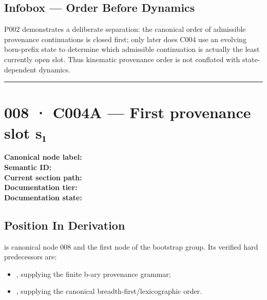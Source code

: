 \subsection{Infobox --- Order Before
Dynamics}\label{infobox-order-before-dynamics}

P002 demonstrates a deliberate separation: the canonical order of
admissible provenance continuations is closed first; only later does
C004 use an evolving born-prefix state to determine which admissible
continuation is actually the least currently open slot. Thus kinematic
provenance order is not conflated with state-dependent dynamics.

\begin{center}\rule{0.5\linewidth}{0.5pt}\end{center}

\section{008 · C004A --- First provenance slot
s₁}\label{c004a-first-provenance-slot-sux2081}

\textbf{Canonical node label:} \texttt{\protect{}}\\
\textbf{Semantic ID:} \texttt{\protect{}}\\
\textbf{Current section path:} \texttt{\protect{}}\\
\textbf{Documentation tier:} \texttt{\protect{}}\\
\textbf{Documentation state:} \texttt{\protect{}}

\subsection{Position In Derivation}\label{position-in-derivation-4}

\texttt{\protect{}} is canonical node 008 and the first node of the bootstrap
group. Its verified hard predecessors are:

\begin{itemize}
\tightlist
\item
  \texttt{\protect{}}, supplying the finite
  b-ary provenance grammar;
\item
  \texttt{\protect{}}, supplying the canonical
  breadth-first/lexicographic order.
\end{itemize}


